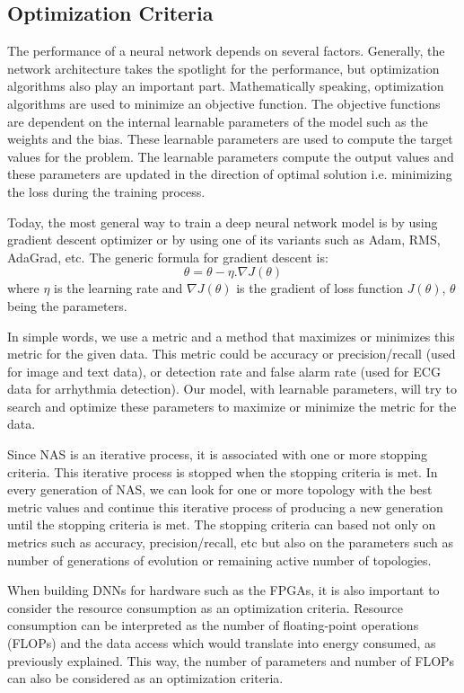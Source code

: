 \subsection{Optimization Criteria}

The performance of a neural network depends on several factors. Generally, the network architecture takes the spotlight for the performance, but optimization algorithms also play an important part. Mathematically speaking, optimization algorithms are used to minimize an objective function. The objective functions are dependent on the internal learnable parameters of the model such as the weights and the bias. These learnable parameters are used to compute the target values for the problem. The learnable parameters compute the output values and these parameters are updated in the direction of optimal solution i.e. minimizing the loss during the training process.

Today, the most general way to train a deep neural network model is by using gradient descent optimizer or by using one of its variants such as Adam, RMS, AdaGrad, etc. The generic formula for gradient descent is:
\newline
\[\theta=\theta - \eta . \nabla J(\theta)\]
\newline
where $\eta$ is the learning rate and $\nabla J(\theta)$ is the gradient of loss function $J(\theta)$, $\theta$ being the parameters.

In simple words, we use a metric and a method that maximizes or minimizes this metric for the given data. This metric could be accuracy or precision/recall (used for image and text data), or detection rate and false alarm rate (used for ECG data for arrhythmia detection). Our model, with learnable parameters, will try to search and optimize these parameters to maximize or minimize the metric for the data.

Since NAS is an iterative process, it is associated with one or more stopping criteria. This iterative process is stopped when the stopping criteria is met. In every generation of NAS, we can look for one or more topology with the best metric values and continue this iterative process of producing a new generation until the stopping criteria is met. The stopping criteria can based not only on metrics such as accuracy, precision/recall, etc but also on the parameters such as number of generations of evolution or remaining active number of topologies. 

When building DNNs for hardware such as the FPGAs, it is also important to consider the resource consumption as an optimization criteria. Resource consumption can be interpreted as the number of floating-point operations (FLOPs) and the data access which would translate into energy consumed, as previously explained. This way, the number of parameters and number of FLOPs can also be considered as an optimization criteria.

